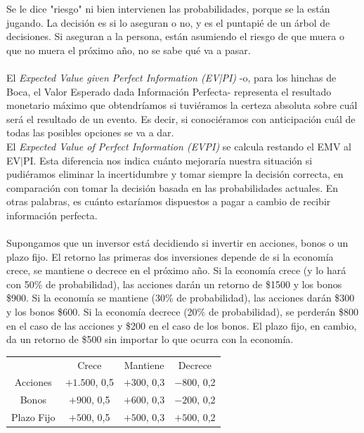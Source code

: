 \documentclass{article}
\newcommand{\ulcolor}[2][Red]{\setulcolor{#1}\ul{#2}}
\begin{document}
            Se le dice "riesgo" ni bien intervienen las probabilidades, porque se la están jugando. La decisión es si lo aseguran o no, y es el puntapié de un árbol de decisiones. Si aseguran a la persona, están asumiendo el riesgo de que muera o que no muera el próximo año, no se sabe qué va a pasar.
            \\
            \\
            El \textit{Expected Value given Perfect Information (EV|PI)} -o, para los hinchas de Boca, el Valor Esperado dada Información Perfecta- representa el resultado monetario máximo que obtendríamos si tuviéramos la certeza absoluta sobre cuál será el resultado de un evento. Es decir, si conociéramos con anticipación cuál de todas las posibles opciones se va a dar.
            \\
            El \textit{Expected Value of Perfect Information (EVPI)} se calcula restando el EMV al EV$|$PI. Esta diferencia nos indica cuánto mejoraría nuestra situación si pudiéramos eliminar la incertidumbre y tomar siempre la decisión correcta, en comparación con tomar la decisión basada en las probabilidades actuales. En otras palabras, es cuánto estaríamos dispuestos a pagar a cambio de recibir información perfecta.
            \\
            \\
            Supongamos que un inversor está decidiendo si invertir en acciones, bonos o un plazo fijo. El retorno las primeras dos inversiones depende de si la economía crece, se mantiene o decrece en el próximo año. Si la economía crece (y lo hará con 50\% de probabilidad), las acciones darán un retorno de \$1500 y los bonos \$900. Si la economía se mantiene (30\% de probabilidad), las acciones darán \$300 y los bonos \$600. Si la economía decrece (20\% de probabilidad), se perderán \$800 en el caso de las acciones y \$200 en el caso de los bonos. El plazo fijo, en cambio, da un retorno de \$500 sin importar lo que ocurra con la economía.
            \\
            \begin{table}[h]
                \begin{tabular}{cccc}
                                & Crece         & Mantiene      & Decrece       \\
                    Acciones    & \ulcolor[Red]{$+1.500$}, 0,5 & $+300$, 0,3   & $-800$, 0,2   \\
                    Bonos       & $+900$, 0,5   & \ulcolor[Red]{$+600$}, 0,3   & $-200$, 0,2   \\
                    Plazo Fijo  & $+500$, 0,5   & $+500$, 0,3   & \ulcolor[Red]{$+500$}, 0,2   \\
                \end{tabular}
            \end{table}
\end{document}
